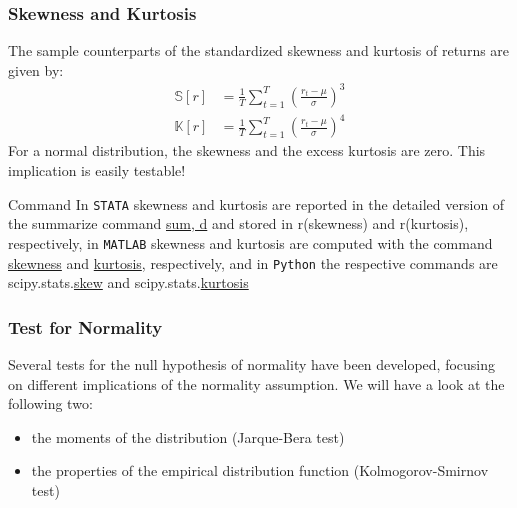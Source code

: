 \documentclass[xcolor=dvipsnames, english, 8pt]{beamer}
\begin{document}
\begin{frame}
    \frametitle{Skewness and Kurtosis}
The sample counterparts of the standardized skewness and kurtosis of returns are given by:
\begin{align}
    \mathbb{S}[r] &= \frac{1}{T}\sum\limits_{t=1}^T \left(\frac{r_t-\mu}{\sigma}\right)^3\\
    \mathbb{K}[r] &= \frac{1}{T}\sum\limits_{t=1}^T \left(\frac{r_t-\mu}{\sigma}\right)^4
\end{align}
For a normal distribution, the skewness and the excess kurtosis are zero. This implication is easily testable!
\vfill
\begin{exampleblock}{{\small{Command}}}
In  \texttt{STATA} skewness and kurtosis are reported in the detailed version of the summarize command \href{https://www.stata.com/manuals13/rsummarize.pdf}{\color{Purple}sum, d} and stored in {\color{Purple} r(skewness)} and {\color{Purple} r(kurtosis)}, respectively, in  \texttt{MATLAB} skewness and kurtosis are computed with the command \href{https://ch.mathworks.com/help/stats/skewness.html}{\color{Purple}skewness} and \href{https://ch.mathworks.com/help/stats/kurtosis.html}{\color{Purple}kurtosis}, respectively, and in \texttt{Python} the respective commands are  scipy.stats.\href{https://docs.scipy.org/doc/scipy/reference/generated/scipy.stats.skew.html}{\color{Purple}skew} and scipy.stats.\href{https://docs.scipy.org/doc/scipy/reference/generated/scipy.stats.kurtosis.html}{\color{Purple}kurtosis}
\end{exampleblock}
\end{frame}


\begin{frame}
    \frametitle{Test for Normality}
    Several tests for the null hypothesis of normality have been developed, focusing on
    different implications of the normality assumption. We will have a look at the following two:\vspace{0.25cm}\\
    \begin{itemize}
        \item the moments of the distribution (Jarque-Bera test)
        \item the properties of the empirical distribution function (Kolmogorov-Smirnov test)
    \end{itemize}

\end{frame}
\end{document}
